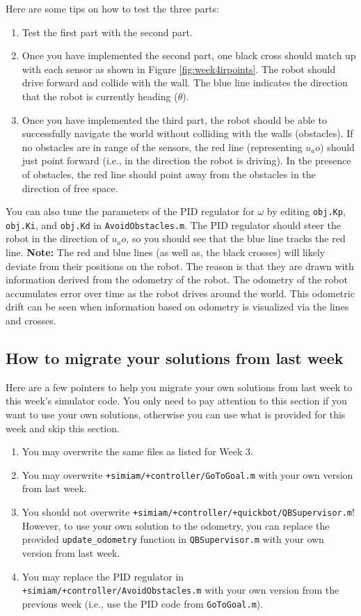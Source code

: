 \documentclass[10pt]{article}
\begin{document}
Here are some tips on how to test the three parts:

\begin{enumerate}
  \item Test the first part with the second part.
  \item Once you have implemented the second part, one black cross should match up with each sensor as shown in Figure \ref{fig:week4irpoints}. The robot should drive forward and collide with the wall. The blue line indicates the direction that the robot is currently heading ($\theta$).
  \item Once you have implemented the third part, the robot should be able to successfully navigate the world without colliding with the walls (obstacles). If no obstacles are in range of the sensors, the red line (representing $u_ao$) should just point forward (i.e., in the direction the robot is driving). In the presence of obstacles, the red line should point away from the obstacles in the direction of free space.
\end{enumerate}

You can also tune the parameters of the PID regulator for $\omega$ by editing \texttt{obj.Kp}, \texttt{obj.Ki}, and \texttt{obj.Kd} in \texttt{AvoidObstacles.m}. The PID regulator should steer the robot in the direction of $u_ao$, so you should see that the blue line tracks the red line. \textbf{Note:} The red and blue lines (as well as, the black crosses) will likely deviate from their positions on the robot. The reason is that they are drawn with information derived from the odometry of the robot. The odometry of the robot accumulates error over time as the robot drives around the world. This odometric drift can be seen when information based on odometry is visualized via the lines and crosses. 

\subsection*{How to migrate your solutions from last week}

Here are a few pointers to help you migrate your own solutions from last week to this week's simulator code. You only need to pay attention to this section if you want to use your own solutions, otherwise you can use what is provided for this week and skip this section.

\begin{enumerate}
 \item You may overwrite the same files as listed for Week 3.
 \item You may overwrite \texttt{+simiam/+controller/GoToGoal.m} with your own version from last week.
 \item You should not overwrite \texttt{+simiam/+controller/+quickbot/QBSupervisor.m}! However, to use your own solution to the odometry, you can replace the provided \texttt{update\_odometry} function in \texttt{QBSupervisor.m} with your own version from last week.
 \item You may replace the PID regulator in \texttt{+simiam/+controller/AvoidObstacles.m} with your own version from the previous week (i.e., use the PID code from \texttt{GoToGoal.m}).
\end{enumerate}
\end{document}
